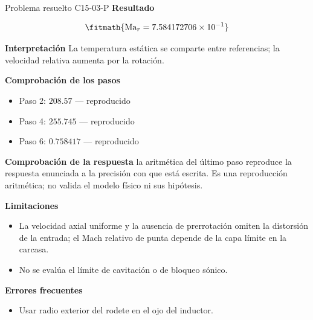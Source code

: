 \documentclass[10pt,openany]{book}
\begin{document}
\begin{studiumworked}{Problema resuelto C15-03-P}
\noindent\textbf{Resultado}

\[
\fitmath{\mathrm{Ma}_r=7.584172706\times10^{-1}}
\]

\noindent\textbf{Interpretación}
La temperatura estática se comparte entre referencias; la velocidad relativa aumenta por la rotación.

\noindent\textbf{Comprobación de los pasos}
\begin{itemize}
\item Paso 2: $208.57$ — reproducido
\item Paso 4: $255.745$ — reproducido
\item Paso 6: $0.758417$ — reproducido
\end{itemize}

\noindent\textbf{Comprobación de la respuesta} la aritmética del último paso reproduce la respuesta enunciada a la precisión con que está escrita. Es una reproducción aritmética; no valida el modelo físico ni sus hipótesis.

\noindent\textbf{Limitaciones}
\begin{itemize}
\item La velocidad axial uniforme y la ausencia de prerrotación omiten la distorsión de la entrada; el Mach relativo de punta depende de la capa límite en la carcasa.
\item No se evalúa el límite de cavitación o de bloqueo sónico.
\end{itemize}

\noindent\textbf{Errores frecuentes}
\begin{itemize}
\item Usar radio exterior del rodete en el ojo del inductor.
\end{itemize}
\end{studiumworked}
\end{document}
